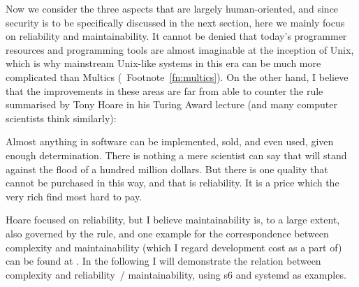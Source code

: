 Now we consider the three aspects that are largely human-oriented, and since
security is to be specifically discussed in the next section, here we mainly
focus on reliability and maintainability.  It cannot be denied that today's
programmer resources and programming tools are almost imaginable at the
inception of Unix, which is why mainstream Unix-like systems in this era can
be much more complicated than Multics (\cf~Footnote~\ref{fn:multics}).  On the
other hand, I believe that the improvements in these areas are far from able
to counter the rule summarised by Tony Hoare in his Turing Award lecture%
 (and many computer scientists think similarly):
\begin{quoting}
	Almost anything in software can be implemented, sold, and even used, given
	enough determination.  There is nothing a mere scientist can say that will
	stand against the flood of a hundred million dollars.  But there is one
	quality that cannot be purchased in this way, and that is reliability.
	It is a price which the very rich find most hard to pay.
\end{quoting}
Hoare focused on reliability, but I believe maintainability is, to a large
extent, also governed by the rule, and one example for the correspondence
between complexity and maintainability (which I regard development cost as a
part of) can be found at \parencite{rbrander2017}.  In the following I will
demonstrate the relation between complexity and reliability~/ maintainability,
using s6 and systemd as examples.

